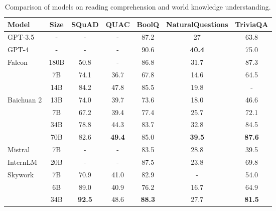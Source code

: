 \begin{table}
  \centering
  \begin{tabular}{lcccccc}
    \toprule
    Model & Size & SQuAD & QUAC & BoolQ & NaturalQuestions & TriviaQA \\
    \midrule
    GPT-3.5 & - & - & - & 87.2 & 27 & 63.8 \\
    GPT-4 & - & - & - & 90.6 & \textbf{40.4} & 75.0 \\
    \gmidrule
    Falcon & 180B & 50.8 & - & 86.8 & 31.7 & 87.3 \\
    \gmidrule
    \multirow{2}{*}{Qwen} 
    & 7B & 74.1 & 36.7 & 67.8 & 14.6 & 64.5 \\
    & 14B & 84.2 & 47.8 & 85.5 & 19.8 & - \\
    \gmidrule
    Baichuan 2 & 13B & 74.0 & 39.7 & 73.6 & 18.0 & 46.6 \\
    \gmidrule
    \multirow{3}{*}{L\textsmaller{LaMA} 2} 
    & 7B & 67.2 & 39.4 & 77.4 & 25.7 & 72.1 \\
    & 34B & 78.8 & 44.3 & 83.7 & 32.8 & 84.5 \\
    & 70B & 82.6 & \textbf{49.4} & 85.0 & \textbf{39.5} & \textbf{87.6} \\
    \gmidrule
    Mistral & 7B & - & - & 83.5 & 28.8 & 39.5 \\
    \gmidrule
    InternLM & 20B & - & - & 87.5 & 23.8 & 69.8 \\
    \gmidrule
    Skywork & 7B & 70.9 & 41.0 & 82.9 & - & 54.0 \\
    \gmidrule
    \multirow{2}{*}{Yi}
    & 6B & 89.0 & 40.9 & 76.2 & 16.7 & 64.9 \\
    & 34B & \textbf{92.5} & 48.6 & \textbf{88.3} & 27.7 & \textbf{81.5} \\
    \bottomrule
  \end{tabular}
  \caption{Comparison of models on reading comprehension and world knowledge understanding.}
  \label{tab:qa}
\end{table}
